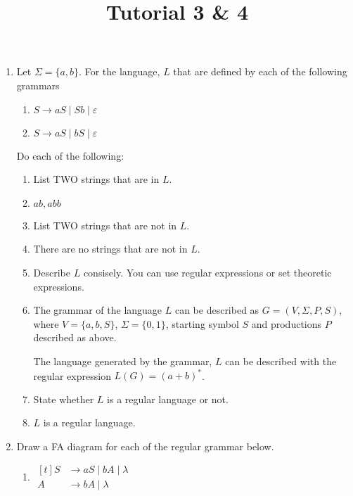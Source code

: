 \documentclass[a4paper, 12pt]{article}
\title{Tutorial 3 & 4}
\date{}
\author{}
\makeatletter
\renewenvironment{proof}[1][\proofname]{\par
  \normalfont \topsep6\p@\@plus6\p@\relax
  \trivlist
  \item[\hskip\labelsep
        \itshape
    #1\@addpunct{.}]\ignorespaces
}{%
  \endtrivlist\@endpefalse
}
\renewcommand{\proofname}{Solution:}
\makeatother
\begin{document}
    \begin{enumerate}
        \item Let \(\Sigma = \{a, b\}\). For the language, $L$ that are defined by each of the following grammars
        \begin{enumerate}[label=(\roman{*})]
            \item \(S \to aS \mid Sb \mid \varepsilon\)
            \item \(S \to aS \mid bS \mid \varepsilon\)
        \end{enumerate}

        Do each of the following:
        \begin{enumerate}

            \item List TWO strings that are in $L$.
            \begin{proof}
                $ab, abb$
            \end{proof}

            \item List TWO strings that are not in $L$.
            \begin{proof}
                There are no strings that are not in $L$.
            \end{proof}

            \item Describe $L$ consisely. You can use regular expressions or set theoretic expressions.
            \begin{proof}
                The grammar of the language $L$ can be described as \(G = (V, \Sigma, P, S)\), where \(V = \{a, b, S\}\), \(\Sigma=\{0, 1\}\), starting symbol $S$ and productions $P$ described as above.

                The language generated by the grammar, $L$ can be described with the regular expression $L(G) = (a+b)^*$.
            \end{proof}

            \item State whether $L$ is a regular language or not.
            \begin{proof}
                $L$ is a regular language.
            \end{proof}
        \end{enumerate}

        \item Draw a FA diagram for each of the regular grammar below.
        \begin{enumerate}
            \item \( \begin{aligned}[t]
                S &\to aS \mid bA \mid \lambda \\
                A &\to bA \mid \lambda
            \end{aligned} \)


\end{enumerate}
\end{enumerate}
\end{document}
